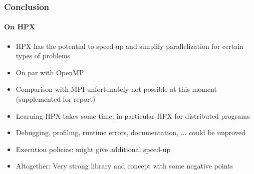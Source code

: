 \begin{frame}
\frametitle{Conclusion}
\framesubtitle{On HPX}
\begin{itemize}
 \item HPX has the potential to speed-up and simplify parallelization for certain types of problems
 \item On par with OpenMP
 \item Comparison with MPI unfortunately not possible at this moment (supplemented for report)
 \item Learning HPX takes some time, in particular HPX for distributed programs
 \item Debugging, profiling, runtime errors, documentation, ...  could be improved
 \item Execution policies: might give additional speed-up
 \item Altogether: Very strong library and concept with some negative points
\end{itemize}
\end{frame}


